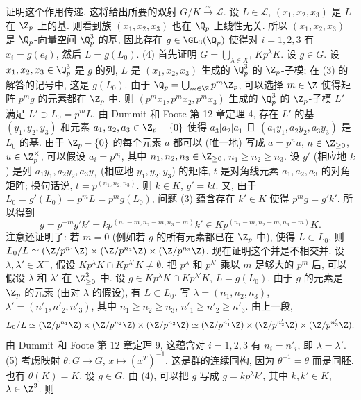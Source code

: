 \begin{solution}
证明这个作用传递, 这将给出所要的双射 $G/K \xrightarrow{\sim} \mathcal{L}$. 设 $L \in \mathcal{L}$, $(x_1, x_2, x_3)$ 是 $L$ 在 $\Z_p$ 上的基. 则看到族 $(x_1, x_2, x_3)$ 也在 $\Q_p$ 上线性无关. 所以 $(x_1, x_2, x_3)$ 是 $\Q_p$-向量空间 $\Q_p^3$ 的基, 因此存在 $g \in \GL_3(\Q_p)$ 使得对 $i = 1, 2, 3$ 有 $x_i = g(e_i)$, 然后 $L = g(L_0)$.
(4) 首先证明 $G = \bigcup_{\lambda \in X^+}Kp^{\lambda}K$. 设 $g \in G$. 设 $x_1, x_2, x_3 \in \Q_p^3$ 是 $g$ 的列, $L$ 是 $(x_1, x_2, x_3)$ 生成的 $\Q_p^3$ 的 $\Z_p$-子模; 在 (3) 的解答的记号中, 这是 $g(L_0)$. 由于 $\Q_p = \bigcup_{m \in \Z}p^m\Z_p$, 可以选择 $m \in \Z$ 使得矩阵 $p^mg$ 的元素都在 $\Z_p$ 中. 则 $(p^mx_1, p^mx_2, p^mx_3)$ 生成的 $\Q_p^3$ 的 $\Z_p$-子模 $L'$ 满足 $L' \supset L_0 = p^mL$. 由 Dummit 和 Foote 第 12 章定理 4, 存在 $L'$ 的基 $(y_1, y_2, y_3)$ 和元素 $a_1, a_2, a_3 \in \Z_p - \{0\}$ 使得 $a_3|a_2|a_1$ 且 $(a_1y_1, a_2y_2, a_3y_3)$ 是 $L_0$ 的基. 由于 $\Z_p - \{0\}$ 的每个元素 $a$ 都可以 (唯一地) 写成 $a = p^nu$, $n \in \Z_{\geq 0}$, $u \in \Z_p^{\times}$, 可以假设 $a_i = p^{n_i}$, 其中 $n_1, n_2, n_3 \in \Z_{\geq 0}$, $n_1 \geq n_2 \geq n_3$. 设 $g'$ (相应地 $k$) 是列 $a_1y_1, a_2y_2, a_3y_3$ (相应地 $y_1, y_2, y_3$) 的矩阵, $t$ 是对角线元素 $a_1, a_2, a_3$ 的对角矩阵; 换句话说, $t = p^{(n_1,n_2,n_3)}$. 则 $k \in K$, $g' = kt$. 又, 由于 $L_0 = g'(L_0) = p^mL = p^mg(L_0)$, 问题 (3) 蕴含存在 $k' \in K$ 使得 $p^mg = g'k'$. 所以得到
\[
g = p^{-m}g'k' = kp^{(n_1-m,n_2-m,n_3-m)}k' \in Kp^{(n_1-m,n_2-m,n_3-m)}K.
\]
注意还证明了: 若 $m = 0$ (例如若 $g$ 的所有元素都已在 $\Z_p$ 中), 使得 $L \subset L_0$, 则 $L_0/L \simeq (\Z/p^{n_1}\Z) \times (\Z/p^{n_2}\Z) \times (\Z/p^{n_3}\Z)$.
现在证明这个并是不相交并. 设 $\lambda, \lambda' \in X^+$, 假设 $Kp^{\lambda}K \cap Kp^{\lambda'}K \neq \emptyset$. 把 $p^{\lambda}$ 和 $p^{\lambda'}$ 乘以 $m$ 足够大的 $p^m$ 后, 可以假设 $\lambda$ 和 $\lambda'$ 在 $\Z_{\geq 0}^3$ 中. 设 $g \in Kp^{\lambda}K \cap Kp^{\lambda'}K$, $L = g(L_0)$. 由于 $g$ 的元素是 $\Z_p$ 的元素 (由对 $\lambda$ 的假设), 有 $L \subset L_0$. 写 $\lambda = (n_1, n_2, n_3)$, $\lambda' = (n'_1, n'_2, n'_3)$, 其中 $n_1 \geq n_2 \geq n_3$, $n'_1 \geq n'_2 \geq n'_3$. 由上一段,
\[
L_0/L \simeq (\Z/p^{n_1}\Z) \times (\Z/p^{n_2}\Z) \times (\Z/p^{n_3}\Z) \simeq (\Z/p^{n'_1}\Z) \times (\Z/p^{n'_2}\Z) \times (\Z/p^{n'_3}\Z).
\]
由 Dummit 和 Foote 第 12 章定理 9, 这蕴含对 $i = 1, 2, 3$ 有 $n_i = n'_i$, 即 $\lambda = \lambda'$.
(5) 考虑映射 $\theta \colon G \to G$, $x \longmapsto (x^T)^{-1}$. 这是群的连续同构, 因为 $\theta^{-1} = \theta$ 而是同胚. 也有 $\theta(K) = K$. 设 $g \in G$. 由 (4), 可以把 $g$ 写成 $g = kp^{\lambda}k'$, 其中 $k, k' \in K$, $\lambda \in \Z^3$. 则

\end{solution}
